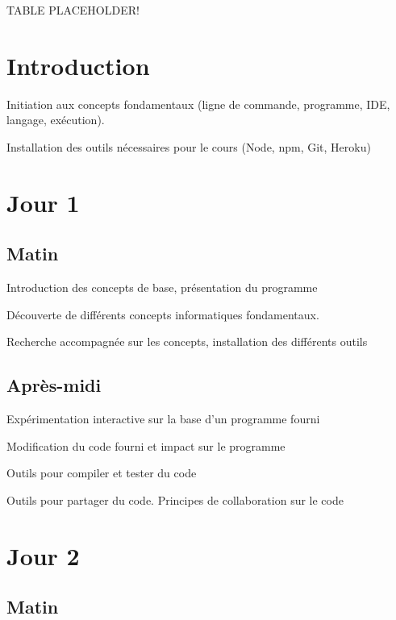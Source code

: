 \documentclass
	[a4paper,
	 11pt     ,
	 babel-en ;
	]
{article}
\begin{document}
TABLE PLACEHOLDER!

\hypertarget{introduction}{%
\section{Introduction}\label{introduction}}

Initiation aux concepts fondamentaux (ligne de commande, programme, IDE,
langage, exécution).

Installation des outils nécessaires pour le cours (Node, npm, Git,
Heroku)

\hypertarget{jour-1}{%
\section{Jour 1}\label{jour-1}}

\hypertarget{matin}{%
\subsection{Matin}\label{matin}}

Introduction des concepts de base, présentation du programme

Découverte de différents concepts informatiques fondamentaux.

Recherche accompagnée sur les concepts, installation des différents
outils

\hypertarget{apruxe8s-midi}{%
\subsection{Après-midi}\label{apruxe8s-midi}}

Expérimentation interactive sur la base d'un programme fourni

Modification du code fourni et impact sur le programme

Outils pour compiler et tester du code

Outils pour partager du code. Principes de collaboration sur le code

\hypertarget{jour-2}{%
\section{Jour 2}\label{jour-2}}

\hypertarget{matin-1}{%
\subsection{Matin}\label{matin-1}}
\end{document}
